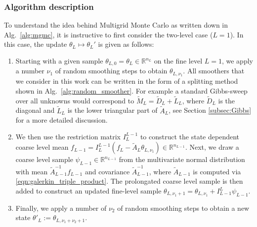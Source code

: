\documentclass[11pt,english]{article}
\theoremstyle{plain}
\theoremstyle{plain}
\theoremstyle{plain}
\theoremstyle{plain}
\numberwithin{equation}{section}
\newcommand{\jg}[1]{#1}
\begin{document}
\subsubsection{\jg{Algorithm description}}
To understand the idea behind Multigrid Monte Carlo as written down in Alg.~\ref{alg:mgmc}, it is instructive to first consider the two-level case ($L=1$). In this case, the update $\theta_L\mapsto\theta_L'$ is given as follows:
\begin{enumerate}
    \item[(i)] Starting with a given sample $\theta_{L,0}=\theta_{L}\in\mathbb{R}^{n_L}$ on the fine level $L=1$, we apply a number $\nu_1$ of random smoothing steps to obtain $\theta_{L,\nu_1}$. All smoothers that we consider in this work can be written in the form of a splitting method shown in Alg.~\ref{alg:random_smoother}. For example a standard Gibbs-sweep over all unknowns would correspond to $\widetilde{M}_L=\widetilde{D}_L+\widetilde{L}_L$, where $\widetilde{D}_L$ is the diagonal and $\widetilde{L}_L$ is the lower triangular part of $\widetilde{A}_L$, see Section \ref{subsec:Gibbs} for a more detailed discussion.
    \item[(ii)] We then use the restriction matrix $I_L^{L-1}$ to construct the state dependent coarse level mean $f_{L-1} = I_L^{L-1}(f_L -\widetilde{A}_L \theta_{L,\nu_1})\in\mathbb{R}^{n_{L-1}}$. Next, we draw a coarse level sample $\psi_{L-1} \in\mathbb{R}^{n_{L-1}}$ from the multivariate normal distribution with mean $\widetilde{A}_{L-1}^{-1}f_{L-1}$ and covariance $\widetilde{A}_{L-1}^{-1}$, where $\widetilde{A}_{L-1} $ is computed via \eqref{eqn:galerkin_triple_product}. The prolongated coarse level sample is then added to construct an updated fine-level sample $\theta_{L,\nu_1+1} = \theta_{L,\nu_1}+I_{L-1}^{L} \psi_{L-1}$.
    \item[(iii)] Finally, we apply a number of $\nu_2$ of random smoothing steps to obtain a new state $\theta'_{L}:=\theta_{L,\nu_1+\nu_2+1}$.
\end{enumerate}
\end{document}
